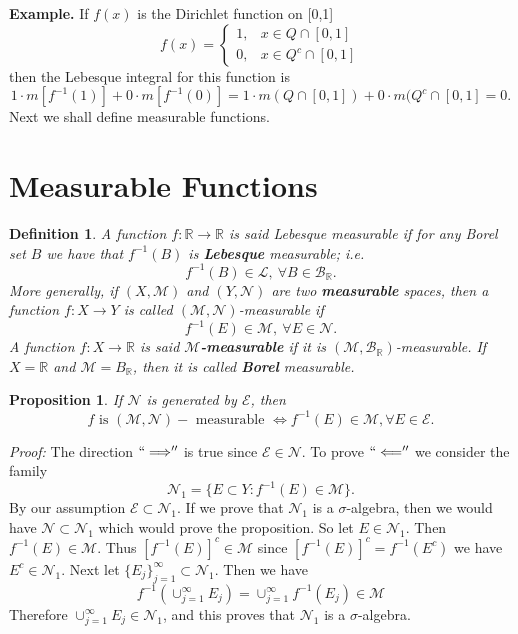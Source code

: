 \documentclass[12pt]{report}
\newtheorem{prop}[theorem]{Proposition}
\newtheorem{definition}[theorem]{Definition}
\begin{document}
\medskip
\noindent
{\bf Example.} If $f(x)$ is the Dirichlet function on [0,1]
\[
 f(x) = \left \{
 \begin{array}{ll} 1, &x \in Q \cap [0,1]\\ 0, &x \in Q^c
\cap [0,1] 
\end{array}\right .
\]
 then the Lebesque integral for this function is
\[
 1 \cdot m[f^{-1} (1)]+ 0 \cdot m[ f^{-1} (0)] = 1 \cdot m(Q \cap
[0,1]) + 0
\cdot m(Q^c \cap [0,1] = 0.
\]
%
Next we shall define measurable functions.

\section{Measurable Functions}

 \begin{definition} A function $f: \mathbb{R} \longrightarrow
\mathbb{R}$ is said Lebesque measurable if for any Borel set 
$B$ we have that $f^{-1} (B)$ is
\textbf{Lebesque} measurable; i.e.
\[ 
f^{-1} (B) \in \mathcal{L}, \ \forall B \in
\mathcal{B}_{\mathbb{R}}.
\]
 More generally, if $(X, \mathcal{M})$ and $(Y, \mathcal{N})$ are
two
\textbf{measurable} spaces, then a function $f: X \longrightarrow Y$ is
called $(\mathcal{M}, \mathcal{N})$-measurable if 
\[
 f^{-1} (E) \in \mathcal{M}, \ \forall E \in \mathcal{N}.
\]
 A function $f: X \longrightarrow \mathbb{R}$ is said
\textbf{$\mathcal{M}$-measurable} if it is $(\mathcal{M},
\mathcal{B}_{\mathbb{R}})$-measurable.  If $X = \mathbb{R}$ and
$\mathcal{M} = B_{\mathbb{R}}$, then it is called \textbf{Borel}
measurable.
 \end{definition}

\begin{prop} If $\mathcal{N}$ is generated by
$\mathcal{E}$, then 
\[
 f \mbox{ is } (\mathcal{M},
\mathcal{N})-\mbox{ measurable }
\Longleftrightarrow f^{-1} (E)
\in \mathcal{M}, \forall E \in \mathcal{E}.
\]
\end{prop}

\noindent
{\em Proof:}  The direction $``\Longrightarrow''$ is true since
$\mathcal{E} \in
\mathcal{N}$.  To prove $``\Longleftarrow''$ we consider the 
family
\[
\mathcal{N}_1 = \{E \subset Y: f^{-1} (E) \in \mathcal{M} \}.
\]
 By our assumption $\mathcal{E} \subset \mathcal{N}_1$.  If we
prove that
$\mathcal{N}_1$ is a  $\sigma$-algebra, then we would have
$\mathcal{N} \subset \mathcal{N}_1$ which would prove the proposition.
So let $E
\in \mathcal{N}_1$.  Then  $f^{-1} (E) \in \mathcal{M}$.  Thus $[f^{-1}
(E)]^c \in \mathcal{M}$ since $[f^{-1}(E)]^c = f^{-1} (E^c)$ we have  $E^c
\in \mathcal{N}_1$.  Next let $\{E_j\}^\infty_{j=1} \subset
\mathcal{N}_1$.  Then we have
\[
 f^{-1} \left ( {\cup}^\infty_{j=1} E_j\right ) =
{\cup}^\infty_{j=1} f^{-1} (E_j) \in
\mathcal{M}
\] 
Therefore ${\cup}^\infty_{j=1} E_j \in
\mathcal{N}_1$, and this proves that
$\mathcal{N}_1$ is a $\sigma$-algebra.
\end{document}
